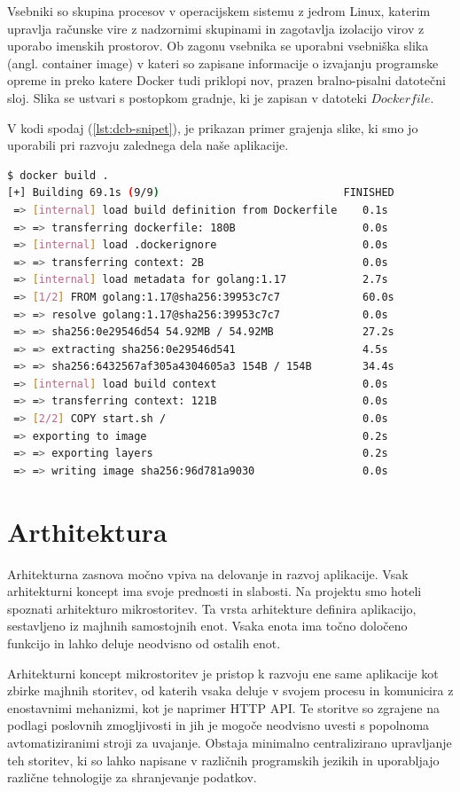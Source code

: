 \documentclass[a4paper, 12pt]{book}
\begin{document}
Vsebniki so skupina procesov v operacijskem sistemu z jedrom Linux, katerim upravlja računske vire z nadzornimi skupinami in zagotavlja izolacijo virov z uporabo imenskih prostorov. Ob zagonu vsebnika se uporabni vsebniška slika (angl. container image) v kateri so zapisane informacije o izvajanju programske opreme in preko katere Docker tudi priklopi nov, prazen bralno-pisalni datotečni sloj. Slika se ustvari s postopkom gradnje, ki je zapisan v datoteki $Dockerfile$. 

V kodi spodaj (\ref{lst:dcb-snipet}), je prikazan primer grajenja slike, ki smo jo uporabili pri razvoju zalednega dela naše aplikacije.
\begin{lstlisting}[language=bash, style=mystyle,caption={Grajenje slike docker vmestnika},label=lst:dcb-snipet]
$ docker build .          
[+] Building 69.1s (9/9)                             FINISHED
 => [internal] load build definition from Dockerfile    0.1s
 => => transferring dockerfile: 180B                    0.0s
 => [internal] load .dockerignore                       0.0s
 => => transferring context: 2B                         0.0s
 => [internal] load metadata for golang:1.17            2.7s
 => [1/2] FROM golang:1.17@sha256:39953c7c7             60.0s
 => => resolve golang:1.17@sha256:39953c7c7             0.0s
 => => sha256:0e29546d54 54.92MB / 54.92MB              27.2s
 => => extracting sha256:0e29546d541                    4.5s
 => => sha256:6432567af305a4304605a3 154B / 154B        34.4s
 => [internal] load build context                       0.0s
 => => transferring context: 121B                       0.0s
 => [2/2] COPY start.sh /                               0.0s 
 => exporting to image                                  0.2s 
 => => exporting layers                                 0.2s 
 => => writing image sha256:96d781a9030                 0.0s 
\end{lstlisting}
\section{Arthitektura}
Arhitekturna zasnova močno vpiva na delovanje in razvoj aplikacije. Vsak arhitekturni koncept ima svoje prednosti in slabosti. Na projektu smo hoteli spoznati arhitekturo mikrostoritev. Ta vrsta arhitekture definira aplikacijo, sestavljeno iz majhnih samostojnih enot. Vsaka enota ima točno določeno funkcijo in lahko deluje neodvisno od ostalih enot.

Arhitekturni koncept mikrostoritev je pristop k razvoju ene same aplikacije kot zbirke majhnih storitev, od katerih vsaka deluje v svojem procesu in komunicira z enostavnimi mehanizmi, kot je naprimer HTTP API. Te storitve so zgrajene na podlagi poslovnih zmogljivosti in jih je mogoče neodvisno uvesti s popolnoma avtomatiziranimi stroji za uvajanje. Obstaja minimalno centralizirano upravljanje teh storitev, ki so lahko napisane v različnih programskih jezikih in uporabljajo različne tehnologije za shranjevanje podatkov. \cite{mfowler-microservices}
\end{document}
